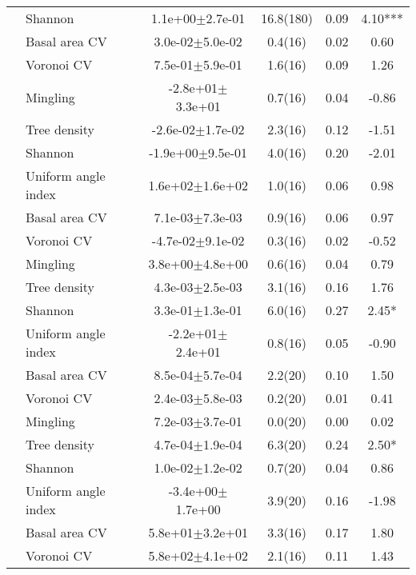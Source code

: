 {\begin{longtable}{llcccS[table-format=-2.2, table-space-text-post = {***}]}
   & Shannon &  1.1e+00$\pm$2.7e-01 & 16.8(180) & 0.09 & 4.10*** \\ 
   \midrule
{} & Basal area CV &  3.0e-02$\pm$5.0e-02 & 0.4(16) & 0.02 & 0.60 \\* 
   & Voronoi CV &  7.5e-01$\pm$5.9e-01 & 1.6(16) & 0.09 & 1.26 \\* 
   & Mingling & -2.8e+01$\pm$3.3e+01 & 0.7(16) & 0.04 & -0.86 \\* 
   & Tree density & -2.6e-02$\pm$1.7e-02 & 2.3(16) & 0.12 & -1.51 \\* 
   & Shannon & -1.9e+00$\pm$9.5e-01 & 4.0(16) & 0.20 & -2.01 \\* 
   & Uniform angle index &  1.6e+02$\pm$1.6e+02 & 1.0(16) & 0.06 & 0.98 \\ 
   \midrule
{} & Basal area CV &  7.1e-03$\pm$7.3e-03 & 0.9(16) & 0.06 & 0.97 \\* 
   & Voronoi CV & -4.7e-02$\pm$9.1e-02 & 0.3(16) & 0.02 & -0.52 \\* 
   & Mingling &  3.8e+00$\pm$4.8e+00 & 0.6(16) & 0.04 & 0.79 \\* 
   & Tree density &  4.3e-03$\pm$2.5e-03 & 3.1(16) & 0.16 & 1.76 \\* 
   & Shannon &  3.3e-01$\pm$1.3e-01 & 6.0(16) & 0.27 & 2.45* \\* 
   & Uniform angle index & -2.2e+01$\pm$2.4e+01 & 0.8(16) & 0.05 & -0.90 \\ 
   \midrule
{} & Basal area CV &  8.5e-04$\pm$5.7e-04 & 2.2(20) & 0.10 & 1.50 \\* 
   & Voronoi CV &  2.4e-03$\pm$5.8e-03 & 0.2(20) & 0.01 & 0.41 \\* 
   & Mingling &  7.2e-03$\pm$3.7e-01 & 0.0(20) & 0.00 & 0.02 \\* 
   & Tree density &  4.7e-04$\pm$1.9e-04 & 6.3(20) & 0.24 & 2.50* \\* 
   & Shannon &  1.0e-02$\pm$1.2e-02 & 0.7(20) & 0.04 & 0.86 \\* 
   & Uniform angle index & -3.4e+00$\pm$1.7e+00 & 3.9(20) & 0.16 & -1.98 \\ 
   \midrule
{} & Basal area CV &  5.8e+01$\pm$3.2e+01 & 3.3(16) & 0.17 & 1.80 \\* 
   & Voronoi CV &  5.8e+02$\pm$4.1e+02 & 2.1(16) & 0.11 & 1.43 \\* 

\end{longtable}}
